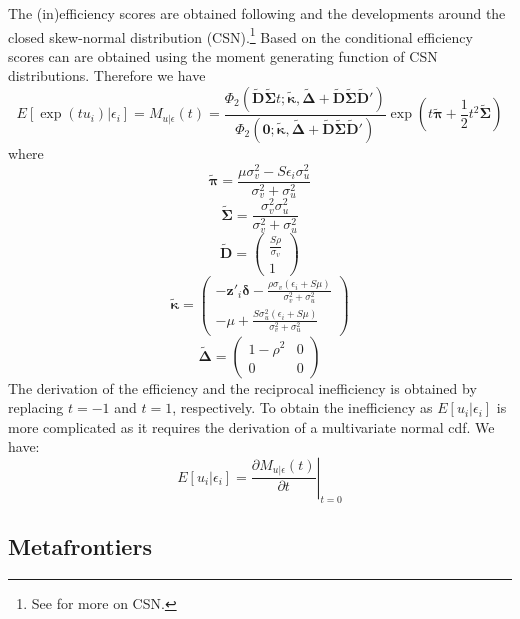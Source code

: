 \documentclass[nojss]{jss}
\begin{document}
 The (in)efficiency scores are obtained following \citet{lai15} and the 
 developments around the closed skew-normal distribution (CSN).\footnote{See 
 \citet{genton04} for more on CSN.} Based on \citet{lai15} the conditional
 efficiency scores can are obtained using the moment generating function of 
 CSN distributions. Therefore we have
 \begin{equation}\label{eq:3.1.10}
 E\left[\exp{\left(tu_i\right)|\epsilon_i}\right] = M_{u|\epsilon}(t)=\frac{\Phi_2\left(\tilde{\mathbf{D}}\tilde{\bm{\Sigma}}t; \tilde{\bm{\kappa}}, \tilde{\bm{\Delta}} + \tilde{\mathbf{D}}\tilde{\bm{\Sigma}}\tilde{\mathbf{D}}' \right)}{\Phi_2\left(\mathbf{0}; \tilde{\bm{\kappa}}, \tilde{\bm{\Delta}} + \tilde{\mathbf{D}}\tilde{\bm{\Sigma}}\tilde{\mathbf{D}}'\right)}\exp{\left(t\tilde{\bm{\pi}} + \frac{1}{2}t^2\tilde{\bm{\Sigma}}\right)}
 \end{equation}
 where
$$\tilde{\bm{\pi}} = \frac{\mu\sigma_v^2 - S\epsilon_i\sigma_u^2}{\sigma_v^2 + \sigma_u^2}$$
%
$$\tilde{\bm{\Sigma}} = \frac{\sigma_v^2\sigma_u^2}{\sigma_v^2 + \sigma_u^2}$$
%
$$\tilde{\mathbf{D}} = \begin{pmatrix} \frac{S\rho}{\sigma_v} \\ 1 \end{pmatrix}$$
%
$$\tilde{\bm{\kappa}} = \begin{pmatrix} - \mathbf{z}'_i\bm{\delta} - \frac{\rho\sigma_v\left(\epsilon_i + S\mu\right)}{\sigma_v^2 + \sigma_u^2}\\ -\mu + \frac{S\sigma_u^2\left(\epsilon_i + S\mu\right)}{\sigma_v^2 + \sigma_u^2} \end{pmatrix}$$
%
$$\tilde{\bm{\Delta}} = \begin{pmatrix}1-\rho^2 & 0 \\ 0 & 0\end{pmatrix}$$
%
The derivation of the efficiency and the reciprocal inefficiency is obtained by replacing
$t = -1$ and $t =1$, respectively. To obtain the inefficiency as $E\left[u_i|\epsilon_i\right]$ is more
complicated as it requires the derivation of a multivariate normal cdf. We have:
%
 \begin{equation}\label{eq:3.1.11}
 E\left[u_i|\epsilon_i\right] = \left. \frac{\partial M_{u|\epsilon}(t)}{\partial t}\right\rvert_{t = 0}
 \end{equation}
 
\subsection{Metafrontiers}
\end{document}
